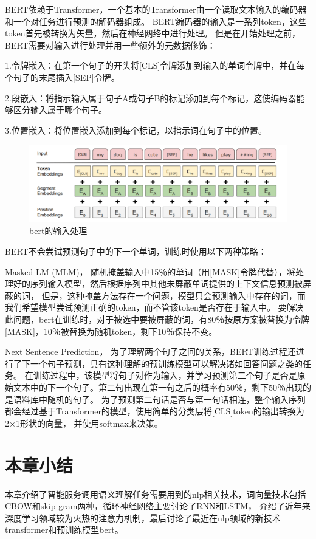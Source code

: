 BERT依赖于Transformer，一个基本的Transformer由一个读取文本输入的编码器和一个对任务进行预测的解码器组成。
BERT编码器的输入是一系列token，这些token首先被转换为矢量，然后在神经网络中进行处理。
但是在开始处理之前，BERT需要对输入进行处理并用一些额外的元数据修饰：

1.令牌嵌入：在第一个句子的开头将[CLS]令牌添加到输入的单词令牌中，并在每个句子的末尾插入[SEP]令牌。

2.段嵌入：将指示输入属于句子A或句子B的标记添加到每个标记，这使编码器能够区分输入属于哪个句子。

3.位置嵌入：将位置嵌入添加到每个标记，以指示词在句子中的位置。
\begin{figure}[htbp]
  \centering
  \includegraphics[scale=0.5]{./images/inputBert.jpg}
  \caption{bert的输入处理\cite{devlin2018bert}}
  \label{fig:inputBert}
\end{figure}

BERT不会尝试预测句子中的下一个单词，训练时使用以下两种策略：

Masked LM (MLM)，
随机掩盖输入中15％的单词（用[MASK]令牌代替），将处理好的序列输入模型，然后根据序列中其他未屏蔽单词提供的上下文信息预测被屏蔽的词，
但是，这种掩盖方法存在一个问题，模型只会预测输入中存在的词，而我们希望模型尝试预测正确的token，而不管该token是否存在于输入中。
要解决此问题，bert在训练时，对于被选中要被屏蔽的词，有80％按原方案被替换为令牌[MASK]，10％被替换为随机token，剩下10％保持不变。

Next Sentence Prediction，
为了理解两个句子之间的关系，BERT训练过程还进行了下一个句子预测，具有这种理解的预训练模型可以解决诸如回答问题之类的任务。
在训练过程中，该模型将句子对作为输入，并学习预测第二个句子是否是原始文本中的下一个句子。第二句出现在第一句之后的概率有50％，剩下50％出现的是语料库中随机的句子。
为了预测第二句话是否与第一句话相连，整个输入序列都会经过基于Transformer的模型，使用简单的分类层将[CLS]token的输出转换为2×1形状的向量，
并使用softmax来决策。

\section{本章小结}
本章介绍了智能服务调用语义理解任务需要用到的nlp相关技术，词向量技术包括CBOW和skip-gram两种，循环神经网络主要讨论了RNN和LSTM，
介绍了近年来深度学习领域较为火热的注意力机制，最后讨论了最近在nlp领域的新技术transformer和预训练模型bert。